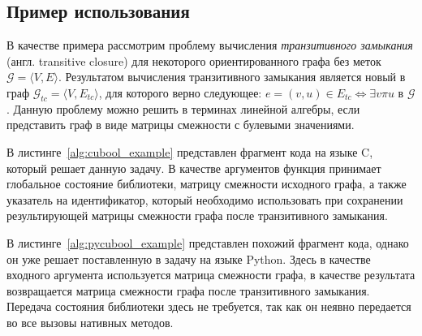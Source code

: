 \subsection{Пример использования}

В качестве примера рассмотрим проблему вычисления \textit{транзитивного замыкания} (англ. transitive closure) для некоторого ориентированного графа без меток $\mathcal{G} = \langle V, E \rangle$. Результатом вычисления транзитивного замыкания является новый в граф $\mathcal{G}_{tc} = \langle V, E_{tc} \rangle$, для которого верно следующее: $e = (v,u) \in E_{tc} \iff \exists v \pi u $ в $\mathcal{G}$. Данную проблему можно решить в терминах линейной алгебры, если представить граф в виде матрицы смежности с булевыми значениями. 

В листинге~\ref{alg:cubool_example} представлен фрагмент кода на языке C, который решает данную задачу. В качестве аргументов функция принимает глобальное состояние библиотеки, матрицу смежности исходного графа, а также указатель на идентификатор, который необходимо использовать при сохранении результирующей матрицы смежности графа после транзитивного замыкания.

В листинге~\ref{alg:pycubool_example} представлен похожий фрагмент кода, однако он уже решает поставленную в задачу на языке Python. Здесь в качестве входного аргумента используется матрица смежности графа, в качестве результата возвращается матрица смежности графа после транзитивного замыкания. Передача состояния библиотеки здесь не требуется, так как он неявно передается во все вызовы нативных методов. 



\lstset{style=codelistingstyle}

